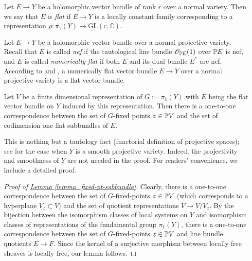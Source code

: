 \begin{defn}
Let $E\rightarrow Y$ be a holomorphic vector bundle of rank $r$ over a normal variety. Then we say that $E$ is \textit{flat} if $E\rightarrow Y$ is a locally constant family corresponding to a representation $\rho:\pi_1(Y)\rightarrow \text{GL}(r,\mathbb{C})$.
\end{defn}

Let $E\rightarrow Y$ be a holomorphic vector bundle over a normal projective variety.
Recall that $E$ is called \emph{nef} if the tautological line bundle $\mathscr O_{\mathbb P E}(1)$ over $\mathbb P E$ is nef, and $E$ is called \emph{numerically flat} if both $E$ and its dual bundle $E^*$ are nef. According to \cite[Theorem 1.18 and Corollay 1.19]{DPS94} and \cite[Section 3]{Sim92},  a numerically flat vector bundle $E\rightarrow Y$ over a normal projective variety is a flat vector bundle. 


\begin{lemme}
\label{lemma_fixed-pt-subbundle}
Let $V$ be a finite dimensional representation of $G:=\pi_1(Y)$ with $E$ being the flat vector bundle on $Y$ induced by this representation. 
Then there is a one-to-one correspondence between the set of $G$-fixed points $z\in\mathbb P V$ and the set of codimension one flat subbundles of $E$.
\end{lemme}


This is nothing but a tautology fact (functorial definition of projective spaces); see \cite[Lemma 4.4]{LOY19} for the case when $Y$ is a smooth projective variety. 
Indeed, the projectivity and smoothness of  $Y$ are not needed in the proof. 
For readers' convenience, we include a detailed proof.

\begin{proof}[Proof of {\hyperref[lemma_fixed-pt-subbundle]{Lemma \ref*{lemma_fixed-pt-subbundle}}}]
Clearly, there is a one-to-one correspondence between the set of $G$-fixed-points $z\in\mathbb P V$ (which corresponds to a hyperplane $V_z\subset V$) and the set of quotient representations $V\to V/V_z$.
By the bijection between the isomorphism classes of  local systems on $Y$ and isomorphism classes of  representations of the fundamental group $\pi_1(Y)$, there is a one-to-one correspondence between  the set of $G$-fixed-points $z\in\mathbb P V$ and line bundle quotients $E\to F$.
Since the kernel of a surjective morphism between locally free sheaves is locally free, our lemma follows.
\end{proof}







